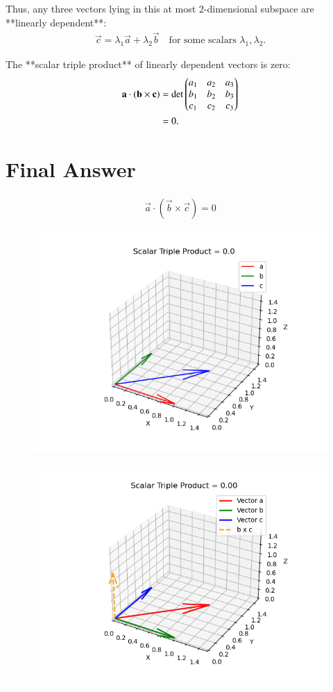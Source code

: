 \documentclass[journal]{IEEEtran}
\begin{document}
Thus, any three vectors lying in this at most 2-dimensional subspace are **linearly dependent**:
\begin{align}
\vec{c} = \lambda_1 \vec{a} + \lambda_2 \vec{b} \quad \text{for some scalars } \lambda_1, \lambda_2. \label{eq:6}
\end{align}

The **scalar triple product** of linearly dependent vectors is zero:
\begin{align}
\mathbf{a} \cdot (\mathbf{b} \times \mathbf{c})
&= \det 
\begin{pmatrix}
a_1 & a_2 & a_3 \\
b_1 & b_2 & b_3 \\
c_1 & c_2 & c_3
\end{pmatrix} \label{eq:7} \\
&= 0. \label{eq:8}
\end{align}

\section*{Final Answer}
\begin{align}
\boxed{\vec{a} \cdot (\vec{b} \times \vec{c}) = 0}
\end{align}
\begin{figure}
    \centering
    \includegraphics[width=0.9\columnwidth]{figs/fig41.png}
    \caption{}
    \label{fig:placeholder}
\end{figure}



\begin{figure}
    \centering
    \includegraphics[width=0.9\columnwidth]{figs/fig42.png}
    \caption{}
    \label{fig:placeholder}
\end{figure}
\end{document}
